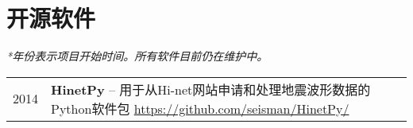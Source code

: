 \section*{开源软件}

\textit{*年份表示项目开始时间。所有软件目前仍在维护中。}

\begin{tabular}{p{} p{}}
2014 & \textbf{HinetPy} -- 用于从Hi-net网站申请和处理地震波形数据的Python软件包 \newline
       \url{https://github.com/seisman/HinetPy/} \\
\end{tabular}
